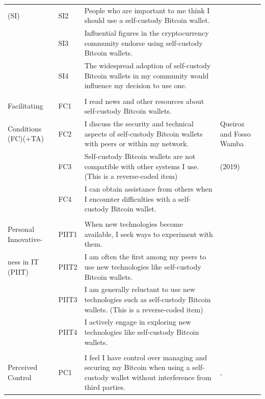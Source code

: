 \documentclass[twocolumn]{article}
\begin{document}
\begin{table}[pb]
\begin{tabular}{@{}p{1.7cm}p{0.7cm}p{10cm}p{3.8cm}@{}}
 (SI)                                     & SI2           & People who are important to me think I should use a self-custody Bitcoin wallet. &  \textcite{queiroz_blockchain_2019} \\
                                          & SI3           & Influential figures in the cryptocurrency community endorse using self-custody Bitcoin wallets. &  \\
                                          & SI4           & The widespread adoption of self-custody Bitcoin wallets in my community would influence my decision to use one. &  \\
\\Facilitating                            & FC1           & I read news and other resources about self-custody Bitcoin wallets. & \textcite{dinev_centrality_2007}  \\
Conditions (FC)(+TA)                      & FC2           & I discuss the security and technical aspects of self-custody Bitcoin wallets with peers or within my network. &  \textcite{venkatesh_user_2003} Queiroz and Fosso Wamba \\
                                          & FC3           & Self-custody Bitcoin wallets are not compatible with other systems I use. (This is a reverse-coded item) & (2019) \\
                                          & FC4           & I can obtain assistance from others when I encounter difficulties with a self-custody Bitcoin wallet. &  \\
\\Personal Innovative-                    & PIIT1         & When new technologies become available, I seek ways to experiment with them. & \textcite{agarwal_conceptual_1998} \\
ness in IT (PIIT)                         & PIIT2         & I am often the first among my peers to use new technologies like self-custody Bitcoin wallets. & \textcite{leong_predicting_2013} \\
                                          & PIIT3         & I am generally reluctant to use new technologies such as self-custody Bitcoin wallets. (This is a reverse-coded item) &  \\
                                          & PIIT4           & I actively engage in exploring new technologies like self-custody Bitcoin wallets. &  \\
\\Perceived Control                       & PC1           & I feel I have control over managing and securing my Bitcoin when using a self-custody wallet without interference from third parties. & \textcite{taylor_understanding_1995}, \textcite{cabinakova_understanding_2019} \\

\end{tabular}
\end{table}
\end{document}
